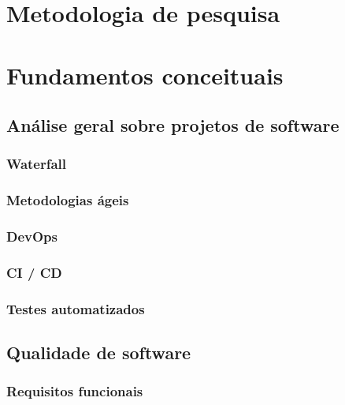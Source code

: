 \documentclass[]{../class/politex}
\begin{document}
  \capa

  \sumario

  

  

  \chapter{Metodologia de pesquisa}

  

  \chapter{Fundamentos conceituais}

    \section{Análise geral sobre projetos de software}

      \subsection{Waterfall}

      \subsection{Metodologias ágeis}

      \subsection{DevOps}

      \subsection{CI / CD}

      \subsection{Testes automatizados}

    \section{Qualidade de software}

      \subsection{Requisitos funcionais}
\end{document}
